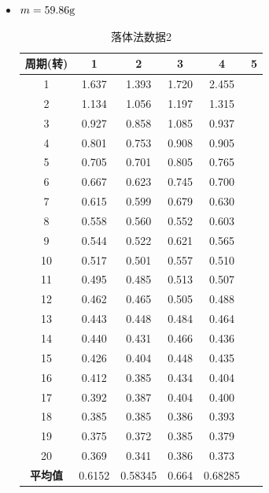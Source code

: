 \documentclass[12pt,hyperref,a4paper,UTF8]{ctexart}
\begin{document}
\begin{itemize}
            \item $m=59.86\text g$
                \begin{table}[h!]
                    \centering
                    \begin{tabular}{cccccc}
                    \toprule
                    \textbf{周期(转)} & \textbf{1} & \textbf{2} & \textbf{3} & \textbf{4} & \textbf{5} \\
                    \midrule
                    1  & 1.637 & 1.393 & 1.720 & 2.455 \\
                    2  & 1.134 & 1.056 & 1.197 & 1.315 \\
                    3  & 0.927 & 0.858 & 1.085 & 0.937 \\
                    4  & 0.801 & 0.753 & 0.908 & 0.905 \\
                    5  & 0.705 & 0.701 & 0.805 & 0.765 \\
                    6  & 0.667 & 0.623 & 0.745 & 0.700 \\
                    7  & 0.615 & 0.599 & 0.679 & 0.630 \\
                    8  & 0.558 & 0.560 & 0.552 & 0.603 \\
                    9  & 0.544 & 0.522 & 0.621 & 0.565 \\
                    10 & 0.517 & 0.501 & 0.557 & 0.510 \\
                    11 & 0.495 & 0.485 & 0.513 & 0.507 \\
                    12 & 0.462 & 0.465 & 0.505 & 0.488 \\
                    13 & 0.443 & 0.448 & 0.484 & 0.464 \\
                    14 & 0.440 & 0.431 & 0.466 & 0.436 \\
                    15 & 0.426 & 0.404 & 0.448 & 0.435 \\
                    16 & 0.412 & 0.385 & 0.434 & 0.404 \\
                    17 & 0.392 & 0.387 & 0.404 & 0.400 \\
                    18 & 0.385 & 0.385 & 0.386 & 0.393 \\
                    19 & 0.375 & 0.372 & 0.385 & 0.379 \\
                    20 & 0.369 & 0.341 & 0.386 & 0.373 \\
                    \midrule
                    \textbf{平均值} & 0.6152 & 0.58345 & 0.664 & 0.68285 \\
                    \bottomrule
                    \end{tabular}
                    \caption{落体法数据2}
                    \end{table}


\end{itemize}
\end{document}
